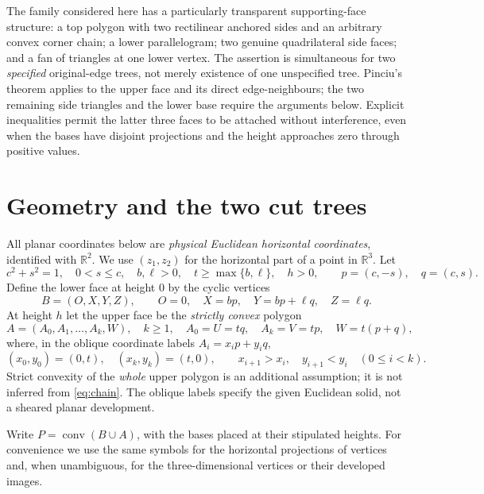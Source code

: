 \documentclass[11pt]{amsart}
\newcommand{\R}{\mathbb{R}}
\newcommand{\conv}{\operatorname{conv}}
\begin{document}
The family considered here has a particularly transparent supporting-face structure: a top polygon with two rectilinear anchored sides and an arbitrary convex corner chain; a lower parallelogram; two genuine quadrilateral side faces; and a fan of triangles at one lower vertex. The assertion is simultaneous for two \emph{specified} original-edge trees, not merely existence of one unspecified tree. Pinciu's theorem applies to the upper face and its direct edge-neighbours; the two remaining side triangles and the lower base require the arguments below. Explicit inequalities permit the latter three faces to be attached without interference, even when the bases have disjoint projections and the height approaches zero through positive values.

\section{Geometry and the two cut trees}
All planar coordinates below are \emph{physical Euclidean horizontal coordinates}, identified with \(\R^2\). We use \((z_1,z_2)\) for the horizontal part of a point in \(\R^3\). Let
\begin{equation}\label{eq:parameters}
 c^2+s^2=1,\quad 0<s\le c,\quad b,\ell>0,\quad
 t\ge\max\{b,\ell\},\quad h>0,\qquad
 p=(c,-s),\quad q=(c,s).
\end{equation}
Define the lower face at height \(0\) by the cyclic vertices
\begin{equation}\label{eq:lower}
 B=(O,X,Y,Z),\qquad O=0,\quad X=bp,\quad Y=bp+\ell q,\quad Z=\ell q.
\end{equation}
At height \(h\) let the upper face be the \emph{strictly convex} polygon
\begin{equation}\label{eq:upper}
 A=(A_0,A_1,\ldots,A_k,W),\quad k\ge1,\quad
 A_0=U=tq,\quad A_k=V=tp,\quad W=t(p+q),
\end{equation}
where, in the oblique coordinate labels \(A_i=x_i p+y_i q\),
\begin{equation}\label{eq:chain}
 (x_0,y_0)=(0,t),\quad (x_k,y_k)=(t,0),\qquad
 x_{i+1}>x_i,\quad y_{i+1}<y_i\quad(0\le i<k).
\end{equation}
Strict convexity of the \emph{whole} upper polygon is an additional assumption; it is not inferred from \eqref{eq:chain}. The oblique labels specify the given Euclidean solid, not a sheared planar development.

Write \(P=\conv(B\cup A)\), with the bases placed at their stipulated heights. For convenience we use the same symbols for the horizontal projections of vertices and, when unambiguous, for the three-dimensional vertices or their developed images.
\end{document}

